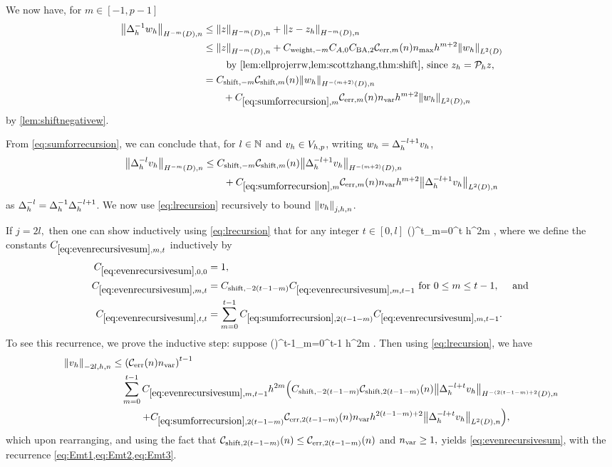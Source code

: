 We now have, for $m \in [-1,p-1]$
\begin{align}
\NHnfn{-m}{D}{\DeltahI \wh} &\leq \NHnfn{-m}{D}{z} + \NHnfn{-m}{D}{z-\zh}\nonumber\\
&\leq \NHnfn{-m}{D}{z} + \Cwfn{-m}  \CAfn{0} \CSZfn{2} \errn{m} \nmax h^{m+2} \NLtD{\wh}\nonumber\\
&\quad\quad\text{ by \cref{lem:ellprojerrw,lem:scottzhang,thm:shift}, since }\zh = \Ph z,\nonumber\\
&= \Cshiftfn{m} \shiftn{m} \NHnfn{-(m+2)}{D}{\wh}\nonumber\\
&\quad\quad+ \Cm \errn{m} \nvar h^{m+2} \NLtDn{\wh}\label{eq:sumforrecursion}
\end{align}
by \cref{lem:shiftnegativew}.

From \cref{eq:sumforrecursion}, we can conclude that, for $l \in \mathbb N$ and $v_{h} \in V_{h,p}$, writing $w_{h} = \Delta_{h}^{-l+1} v_{h}$,
\begin{align}
  \NHnfn{-m}{D}{\Deltahml \vh} &\leq \Cshiftfn{m}\shiftn{m} \NHnfn{-(m+2)}{D}{\Deltahmlpo \vh}\nonumber\\
  &\quad\quad+ \Cm \errn{m} \nvar h^{m+2} \NLtDn{\Deltahmlpo \vh}\label{eq:lrecursion}
\end{align}
as $\Delta_{h}^{-l} = \Delta_{h}^{-1} \Delta_{h}^{-l+1}$. We now use \cref{eq:lrecursion} recursively to bound $\Nfn{j,h,n}{\vh}$.

If $j = 2l,$ then one can show inductively using \cref{eq:lrecursion} that for any integer $t \in [0,l]$
\beq\label{eq:evenrecursivesum}
 \leq \mleft(\En\nvar\mright)^t\sum_{m=0}^t  h^{2m}  ,
\eeq
where we define the constants $\Efn{m,t}$ inductively by
\begin{align}
\label{eq:Emt1}\Efn{0,0} &=1,\\
\label{eq:Emt2}\Efn{m,t} &= \Cshiftfn{2(t-1-m)} \Efn{m,t-1} \tfor 0 \leq m \leq t-1, \quad\tand\\
\label{eq:Emt3}\Efn{t,t} &= \sum_{m=0}^{t-1} \Csumrecfn{2(t-1-m)} \Efn{m,t-1}.
\end{align}
To see this recurrence, we prove the inductive step: suppose
\beqs
{} \leq \mleft(\En\nvar\mright)^{t-1}\sum_{m=0}^{t-1}  h^{2m} .
\eeqs
Then using \cref{eq:lrecursion}, we have
\begin{align*}
  \Nfn{-2l,h,n}{\vh} &\leq \mleft(\En\nvar\mright)^{t-1}\\
  &\quad\sum_{m=0}^{t-1} \Efn{m,t-1} h^{2m} \mleft(\Cshiftfn{2(t-1-m)}\shiftn{2(t-1-m)} \NHnfn{-(2(t-1-m)+2}{D}{\Deltah^{-l+t} \vh}\mright.\\
&\quad\quad\quad\mleft.+ \Csumrecfn{2(t-1-m)} \errn{2(t-1-m)} \nvar h^{2(t-1-m)+2} \NLtDn{\Deltah^{-l+t} \vh}\mright),
\end{align*}
which upon rearranging, and using the fact that $\shiftn{2(t-1-m)} \leq \errn{2(t-1-m)}$ and $n_{\mathrm{var}} \geq 1,$ yields \cref{eq:evenrecursivesum}, with the recurrence \cref{eq:Emt1,eq:Emt2,eq:Emt3}.

